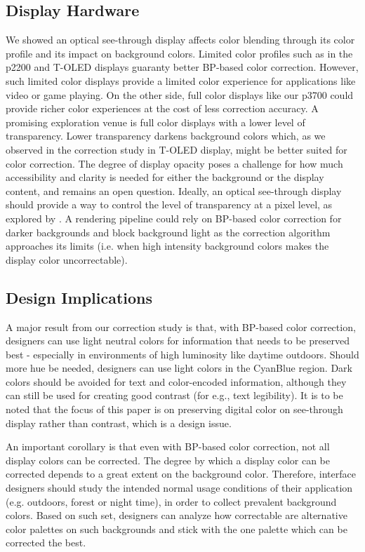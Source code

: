 \documentclass[annual]{acmsiggraph}
\begin{document}
\subsection{Display Hardware}
We showed an optical see-through display affects color blending through its color profile and its impact on background colors. Limited color profiles such as in the p2200 and T-OLED displays guaranty better BP-based color correction. However, such limited color displays provide a limited color experience for applications like video or game playing. On the other side, full color displays like our p3700 could provide richer color experiences at the cost of less correction accuracy. A promising exploration venue is full color displays with a lower level of transparency. Lower transparency darkens background colors which, as we observed in the correction study in T-OLED display, might be better suited for color correction. The degree of display opacity poses a challenge for how much accessibility and clarity is needed for either the background or the display content, and remains an open question. Ideally, an optical see-through display should provide a way to control the level of transparency at a pixel level, as explored by \cite{Kiyokawa:2003}. A rendering pipeline could rely on BP-based color correction for darker backgrounds and block background light as the correction algorithm approaches its limits (i.e. when high intensity background colors makes the display color uncorrectable).
\subsection{Design Implications}
A major result from our correction study is that, with BP-based color correction, designers can use light neutral colors for information that needs to be preserved best - especially in environments of high luminosity like daytime outdoors. Should more hue be needed, designers can use light colors in the CyanBlue region. Dark colors should be avoided for text and color-encoded information, although they can still be used for creating good contrast (for e.g., text legibility). It is to be noted that the focus of this paper is on preserving digital color on see-through display rather than contrast, which is a design issue.

An important corollary is that even with BP-based color correction, not all display colors can be corrected. The degree by which a display color can be corrected depends to a great extent on the background color. Therefore, interface designers should study the intended normal usage conditions of their application (e.g. outdoors, forest or night time), in order to collect prevalent background colors. Based on such set, designers can analyze how correctable are alternative color palettes on such backgrounds and stick with the one palette which can be corrected the best.
\end{document}
